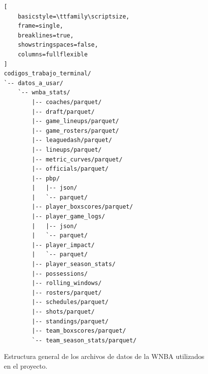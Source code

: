 \begin{figure}[H]
\centering
\begin{minipage}{0.95\textwidth}
\begin{lstlisting}[
    basicstyle=\ttfamily\scriptsize,
    frame=single,
    breaklines=true,
    showstringspaces=false,
    columns=fullflexible
]
codigos_trabajo_terminal/
`-- datos_a_usar/
    `-- wnba_stats/
        |-- coaches/parquet/
        |-- draft/parquet/
        |-- game_lineups/parquet/
        |-- game_rosters/parquet/
        |-- leaguedash/parquet/
        |-- lineups/parquet/
        |-- metric_curves/parquet/
        |-- officials/parquet/
        |-- pbp/
        |   |-- json/
        |   `-- parquet/
        |-- player_boxscores/parquet/
        |-- player_game_logs/
        |   |-- json/
        |   `-- parquet/
        |-- player_impact/
        |   `-- parquet/
        |-- player_season_stats/
        |-- possessions/
        |-- rolling_windows/
        |-- rosters/parquet/
        |-- schedules/parquet/
        |-- shots/parquet/
        |-- standings/parquet/
        |-- team_boxscores/parquet/
        `-- team_season_stats/parquet/
\end{lstlisting}
\end{minipage}
\caption{Estructura general de los archivos
de datos de la WNBA utilizados en el proyecto.}
\label{fig:estructura_archivos_wnba}
\end{figure}

